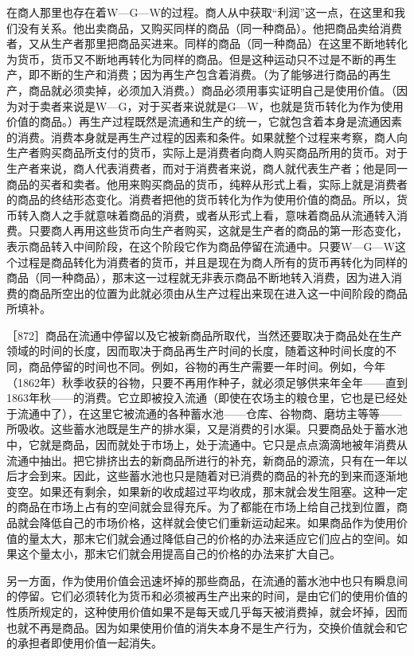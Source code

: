 在商人那里也存在着W—G—W的过程。商人从中获取“利润”这一点，在这里和我们没有关系。他出卖商品，又购买同样的商品（同一种商品）。他把商品卖给消费者，又从生产者那里把商品买进来。同样的商品（同一种商品）在这里不断地转化为货币，货币又不断地再转化为同样的商品。但是这种运动只不过是不断的再生产，即不断的生产和消费；因为再生产包含着消费。（为了能够进行商品的再生产，商品就必须卖掉，必须加入消费。）商品必须用事实证明自己是使用价值。（因为对于卖者来说是W—G，对于买者来说就是G—W，也就是货币转化为作为使用价值的商品。）再生产过程既然是流通和生产的统一，它就包含着本身是流通因素的消费。消费本身就是再生产过程的因素和条件。如果就整个过程来考察，商人向生产者购买商品所支付的货币，实际上是消费者向商人购买商品所用的货币。对于生产者来说，商人代表消费者，而对于消费者来说，商人就代表生产者；他是同一商品的买者和卖者。他用来购买商品的货币，纯粹从形式上看，实际上就是消费者的商品的终结形态变化。消费者把他的货币转化为作为使用价值的商品。所以，货币转入商人之手就意味着商品的消费，或者从形式上看，意味着商品从流通转入消费。只要商人再用这些货币向生产者购买，这就是生产者的商品的第一形态变化，表示商品转入中间阶段，在这个阶段它作为商品停留在流通中。只要W—G—W这个过程是商品转化为消费者的货币，并且是现在为商人所有的货币再转化为同样的商品（同一种商品），那末这一过程就无非表示商品不断地转入消费，因为进入消费的商品所空出的位置为此就必须由从生产过程出来现在进入这一中间阶段的商品所填补。

［872］商品在流通中停留以及它被新商品所取代，当然还要取决于商品处在生产领域的时间的长度，因而取决于商品再生产时间的长度，随着这种时间长度的不同，商品停留的时间也不同。例如，谷物的再生产需要一年时间。例如，今年（1862年）秋季收获的谷物，只要不再用作种子，就必须足够供来年全年——直到1863年秋——的消费。它立即被投入流通（即使在农场主的粮仓里，它也是已经处于流通中了），在这里它被流通的各种蓄水池——仓库、谷物商、磨坊主等等——所吸收。这些蓄水池既是生产的排水渠，又是消费的引水渠。只要商品处于蓄水池中，它就是商品，因而就处于市场上，处于流通中。它只是点点滴滴地被年消费从流通中抽出。把它排挤出去的新商品所进行的补充，新商品的源流，只有在一年以后才会到来。因此，这些蓄水池也只是随着对已消费的商品的补充的到来而逐渐地变空。如果还有剩余，如果新的收成超过平均收成，那末就会发生阻塞。这种一定的商品在市场上占有的空间就会显得充斥。为了都能在市场上给自己找到位置，商品就会降低自己的市场价格，这样就会使它们重新运动起来。如果商品作为使用价值的量太大，那末它们就会通过降低自己的价格的办法来适应它们应占的空间。如果这个量太小，那末它们就会用提高自己的价格的办法来扩大自己。

另一方面，作为使用价值会迅速坏掉的那些商品，在流通的蓄水池中也只有瞬息间的停留。它们必须转化为货币和必须被再生产出来的时间，是由它们的使用价值的性质所规定的，这种使用价值如果不是每天或几乎每天被消费掉，就会坏掉，因而也就不再是商品。因为如果使用价值的消失本身不是生产行为，交换价值就会和它的承担者即使用价值一起消失。

